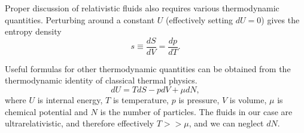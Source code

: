 \iffalse
The
\href{https://en.wikipedia.org/wiki/Clausius\%E2\%80\%93Clapeyron_relation}{Clausius-Clapeyron relation} states that
\cite[eq. 5.47, 5.48]{schroeder_thermal_2000}
\begin{equation}
\frac{dp}{dT} = \frac{L}{T \Delta V} = \frac{\Delta S}{\Delta V}.
\end{equation}
\fi

Proper discussion of relativistic fluids also requires various thermodynamic quantities.
Perturbing around a constant $U$ (effectively setting $dU=0$) gives the entropy density
\cite[p. 23]{lecture_notes}
\begin{equation}
s \equiv \frac{dS}{dV} = \frac{dp}{dT}.
\label{eq:entropy_density}
\end{equation}

Useful formulas for other thermodynamic quantities can be obtained from the thermodynamic identity of classical thermal physics.
\cites[eq. 2.136]{rezzolla_relativistic_2013}[eq. 3.68]{schroeder_thermal_2000}
\begin{equation}
dU = TdS - pdV + \mu dN,
\label{eq:thermodynamic_identity}
\end{equation}
where $U$ is internal energy, $T$ is temperature, $p$ is pressure, $V$ is volume, $\mu$ is chemical potential and $N$ is the number of particles.
The fluids in our case are ultrarelativistic, and therefore effectively $T >> \mu$,
and we can neglect $dN$.

